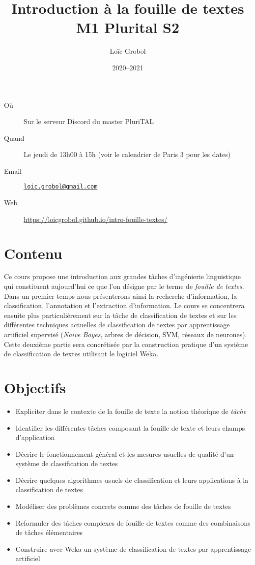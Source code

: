 \documentclass[a4paper, 11pt]{article}
\title{Introduction à la fouille de textes\\M1 Plurital S2}
\author{Loïc Grobol}
\date{2020–2021}
\begin{document}
\vspace*{-7em}
{\let\newpage\relax\maketitle}
\thispagestyle{main}

\begin{description}
    \item[Où] Sur le serveur Discord du master PluriTAL
    \item[Quand] Le jeudi de 13h00 à 15h (voir le calendrier de Paris 3 pour les dates)
    \item[Email] \href{mailto:loic.grobol@gmail.com}{\texttt{loic.grobol@gmail.com}}
    \item[Web] \url{https://loicgrobol.github.io/intro-fouille-textes/}
\end{description}

\section*{Contenu}
Ce cours propose une introduction aux grandes tâches d'ingénierie linguistique qui constituent aujourd'hui ce que l'on désigne par le terme de \emph{fouille de textes}.
Dans un premier temps nous présenterons ainsi la recherche d'information, la classification, l'annotation et l'extraction d'information.
Le  cours se  concentrera ensuite plus particulièrement sur la tâche de classification de textes et sur les différentes techniques actuelles de classification de textes par apprentissage artificiel supervisé (\emph{Naive Bayes}, arbres de décision, SVM, réseaux de neurones).
Cette deuxième partie sera concrétisée par la construction pratique d'un système de classification de textes utilisant le logiciel Weka.

\section*{Objectifs}

\begin{itemize}
    \item Expliciter dans le contexte de la fouille de texte la notion théorique de \emph{tâche}
    \item Identifier les différentes tâches composant la fouille de texte et leurs champs d'application
    \item Décrire le fonctionnement général et les mesures usuelles de qualité d'un système de classification de textes
    \item Décrire quelques algorithmes usuels de classification et leurs applications à la classification de textes
    \item Modéliser des problèmes concrets comme des tâches de fouille de textes
    \item Reformuler des tâches complexes de fouille de textes comme des combinaisons de tâches élémentaires
    \item Construire avec Weka un système de classification de textes par apprentissage artificiel
\end{itemize}
\end{document}
